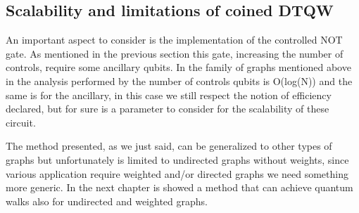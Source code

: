 \subsection{Scalability and limitations of coined DTQW}

An important aspect to consider is the implementation of the controlled NOT gate. As mentioned in the previous section this gate, 
increasing the number of controls, require some ancillary qubits. In the family of graphs mentioned above in the analysis performed by 
\cite{douglas2014complexity} the number of controls qubits is O(log(N)) and the same is for the ancillary, in this case we still respect the 
notion of efficiency declared, but for sure is a parameter to consider for the scalability of these circuit. 

The method presented, as we just said, can be generalized to other types of graphs but unfortunately is limited to undirected graphs
without weights, since various application require weighted and/or directed graphs we need something more generic. In the next chapter
is showed a method that can achieve quantum walks also for undirected and weighted graphs.